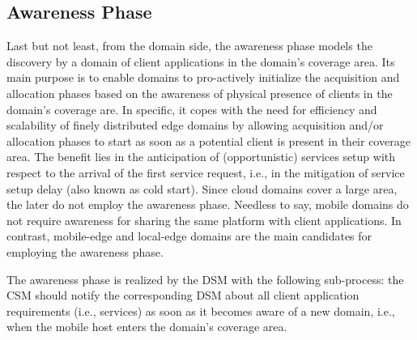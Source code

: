 \subsection{Awareness Phase}\label{sec:A3-E-awareness}




Last but not least, from the domain side, the awareness phase models the discovery by a domain of client applications in the domain's coverage area. Its main purpose is to enable domains to pro-actively initialize the acquisition and allocation phases based on the awareness of physical presence of clients in the domain's coverage are. In specific, it copes with the need for efficiency and scalability of finely distributed edge domains by allowing acquisition and/or allocation phases to start as soon as a potential client is present in their coverage area. The benefit lies in the anticipation of (opportunistic) services setup with respect to the arrival of the first service request, i.e., in the mitigation of service setup delay (also known as cold start). Since cloud domains cover a large area, the later do not employ the awareness phase. Needless to say, mobile domains do not require awareness for sharing the same platform with client applications. In contrast, mobile-edge and local-edge domains are the main candidates for employing the awareness phase. 

The awareness phase is realized by the DSM with the following sub-process: the CSM should notify the corresponding DSM about all client application requirements (i.e., services) as soon as it becomes aware of a new domain, i.e., when the mobile host enters the domain's coverage area. 

